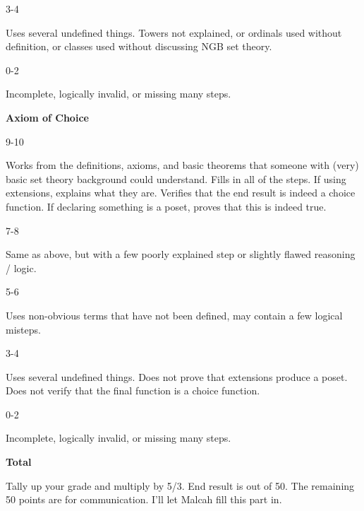\documentclass{article}
\begin{document}
    \par\hfill\par
    3-4
    \par
    Uses several undefined things. Towers not explained, or ordinals used
    without definition, or classes used without discussing NGB set theory.
    \par\hfill\par
    0-2
    \par
    Incomplete, logically invalid, or missing many steps.
    \par\hfill\par
    \textbf{Axiom of Choice}
    \par\hfill\par
    9-10
    \par
    Works from the definitions, axioms, and basic theorems that
    someone with (very) basic set theory background could
    understand. Fills in all of the steps. If using extensions, explains what
    they are. Verifies that the end result is indeed a choice function.
    If declaring something is a poset, proves that this is indeed true.
    \par\hfill\par
    7-8
    \par
    Same as above, but with a few poorly explained step or slightly
    flawed reasoning / logic.
    \par\hfill\par
    5-6
    \par
    Uses non-obvious terms that have not been defined, may contain a few
    logical misteps.
    \par\hfill\par
    3-4
    \par
    Uses several undefined things. Does not prove that extensions produce
    a poset. Does not verify that the final function is a choice function.
    \par\hfill\par
    0-2
    \par
    Incomplete, logically invalid, or missing many steps.
    \par\hfill\par
    \textbf{Total}
    \par
    Tally up your grade and multiply by 5/3. End result is out of 50.
    The remaining 50 points are for communication. I'll let Malcah fill this
    part in.
\end{document}
